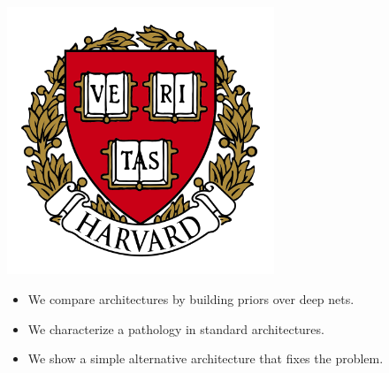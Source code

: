 \documentclass[portrait,a0b,final,a4resizeable]{include/a0poster}
\def\jointspacing{\vspace{0.3in}}
\begin{document}
\begin{poster}
\begin{center}
\begin{pcolumn}{1.03}
{{\begin{minipage}[c]{\logowidth}
\begin{flushright}
    \includegraphics[width=8cm,trim=2em 0em 2em 2em, clip]{badges/harvard}
  \end{flushright}
\end{minipage}}
%
}
\end{pcolumn}
\end{center}

\vspace*{2cm}

\large



\Large

\begin{multicols}{2}



\vspace*{-1.5cm}
\null\hspace*{3cm}\begin{minipage}[c]{0.8\columnwidth}
\centering
\begin{itemize}
\item We compare architectures by building priors over deep nets.
\item We characterize a pathology in standard architectures.
\item We show a simple alternative architecture that fixes the problem.
\end{itemize}
\end{minipage}

\jointspacing


\center
\begin{centering}

\end{centering}



\end{multicols}
\end{poster}
\end{document}
